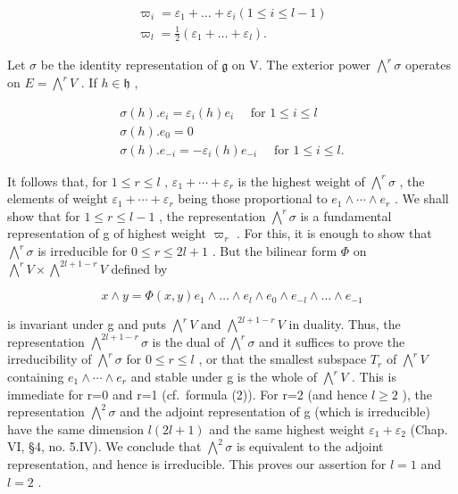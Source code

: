 \[
\begin{array}{l} \varpi_ {i} = \varepsilon_ {1} + \dots + \varepsilon_ {i} (1 \leq i \leq l - 1) \\ \varpi_ {l} = \frac {1}{2} (\varepsilon_ {1} + \dots + \varepsilon_ {l}). \end{array}
\]

Let \(\sigma\) be the identity representation of \(\mathfrak{g}\) on V. The exterior power \(\bigwedge^{r}\sigma\) operates on \(E = \bigwedge^{r}V\) . If \(h\in \mathfrak{h}\) ,

\[
\begin{array}{l} \sigma (h). e _ {i} = \varepsilon_ {i} (h) e _ {i} \quad \text { for } 1 \leq i \leq l \\ \sigma (h). e _ {0} = 0 \\ \sigma (h). e _ {- i} = - \varepsilon_ {i} (h) e _ {- i} \quad \text { for } 1 \leq i \leq l. \end{array}
\]

It follows that, for \(1 \leq r \leq l\) , \(\varepsilon_{1} + \cdots + \varepsilon_{r}\) is the highest weight of \(\bigwedge^{r}\sigma\) , the elements of weight \(\varepsilon_{1} + \cdots + \varepsilon_{r}\) being those proportional to \(e_{1} \wedge \cdots \wedge e_{r}\) . We shall show that for \(1 \leq r \leq l - 1\) , the representation \(\bigwedge^{r}\sigma\) is a fundamental representation of g of highest weight \(\varpi_{r}\) . For this, it is enough to show that \(\bigwedge^{r}\sigma\) is irreducible for \(0 \leq r \leq 2l + 1\) . But the bilinear form \(\Phi\) on \(\bigwedge^{r}V \times \bigwedge^{2l+1-r}V\) defined by

\[
x \wedge y = \varPhi (x, y) e _ {1} \wedge \dots \wedge e _ {l} \wedge e _ {0} \wedge e _ {- l} \wedge \dots \wedge e _ {- 1}
\]

is invariant under g and puts \(\bigwedge^{r}V\) and \(\bigwedge^{2l+1-r}V\) in duality. Thus, the representation \(\bigwedge^{2l+1-r}\sigma\) is the dual of \(\bigwedge^{r}\sigma\) and it suffices to prove the irreducibility of \(\bigwedge^{r}\sigma\) for \(0\leq r\leq l\) , or that the smallest subspace \(T_{r}\) of \(\bigwedge^{r}V\) containing \(e_{1}\wedge\cdots\wedge e_{r}\) and stable under g is the whole of \(\bigwedge^{r}V\) . This is immediate for r=0 and r=1 (cf.~formula (2)). For r=2 (and hence \(l\geq2\) ), the representation \(\bigwedge^{2}\sigma\) and the adjoint representation of g (which is irreducible) have the same dimension \(l(2l + 1)\) and the same highest weight \(\varepsilon_1 + \varepsilon_2\) (Chap. VI, §4, no. 5.IV). We conclude that \(\bigwedge^2\sigma\) is equivalent to the adjoint representation, and hence is irreducible. This proves our assertion for \(l = 1\) and \(l = 2\) .

